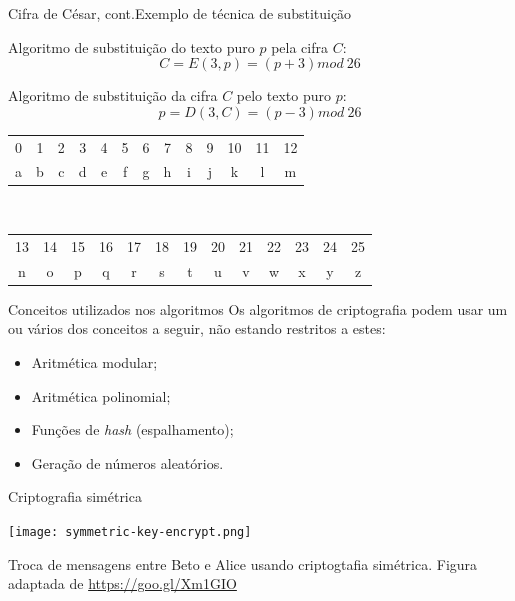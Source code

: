 \begin{frame}{Cifra de César, cont.}{Exemplo de técnica de substituição}

Algoritmo de substituição do texto puro $p$ pela cifra $C$:\\

$$C = E(3, p) = (p+3) mod\ 26$$

Algoritmo de substituição da cifra $C$ pelo texto puro $p$:\\

$$p = D(3, C) = (p-3) mod\ 26$$

\begingroup
\begin{center}
\scriptsize
\begin{tabular}{ccccccccccccc}
0& 1& 2 &3 &4 &5& 6 & 7& 8& 9& 10 & 11 & 12\\
a& b& c &d &e &f& g & h& i& j & k &  l &  m\\
\end{tabular}\\\bigskip
\begin{tabular}{ccccccccccccc}
13& 14& 15 & 16 & 17 & 18 & 19 & 20 & 21 & 22 & 23 & 24 & 25 \\
 n&  o&  p &  q &  r &  s &  t &  u &  v &  w &  x &  y &  z \\
\end{tabular}
\end{center}
\endgroup

\end{frame}

\begin{frame}{Conceitos utilizados nos algoritmos}
  Os algoritmos de criptografia podem usar um ou vários dos conceitos
  a seguir, não estando restritos a estes:

  \begin{itemize}[<+-| alert@+>]
  \item Aritmética modular;
  \item Aritmética polinomial;
  \item Funções de {\it hash} (espalhamento);
  \item Geração de números aleatórios.
  \end{itemize}
\end{frame}



\begin{frame}{Criptografia simétrica}

\begin{center}
\texttt{[image: symmetric-key-encrypt.png]}
\end{center}

\scriptsize Troca de mensagens entre Beto e Alice usando criptogtafia
simétrica. Figura adaptada de \url{https://goo.gl/Xm1GIO}

\end{frame}

